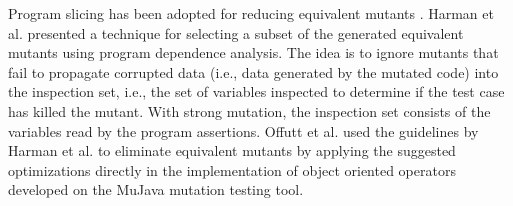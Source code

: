Program slicing has been adopted for reducing equivalent mutants \cite{voas1997software, hierons1999using, harman2001relationship}. Harman et al. \cite{harman2001relationship} presented a technique 
for selecting a subset of the generated equivalent mutants using program dependence analysis. 
The idea is to 
ignore
mutants that fail to propagate corrupted data (i.e., data generated by the mutated code)
into the inspection set, i.e., the set of variables inspected to determine if the test case has killed the mutant. With strong mutation, the inspection set consists of the variables read by the program assertions.
Offutt et al. \cite{offutt2006class} used the guidelines by Harman et al. \cite{harman2001relationship} to eliminate equivalent mutants by applying the suggested optimizations directly in the implementation of object oriented operators developed on the MuJava mutation testing tool. 

